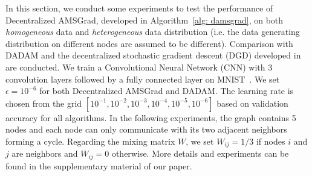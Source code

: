 \documentclass{article} %
\begin{document}
In this section, we conduct some experiments to test the performance of Decentralized AMSGrad, developed in Algorithm~\ref{alg: damsgrad}, on both \emph{homogeneous} data and \emph{heterogeneous} data distribution (i.e. the data generating distribution on different nodes are assumed to be different). 
Comparison with DADAM and the decentralized stochastic gradient descent (DGD) developed in \citet{lian2017can} are conducted. 
We train a Convolutional Neural Network (CNN) with 3 convolution layers followed by a fully connected layer on MNIST~\citep{lecun1998mnist}.
We set $\epsilon = 10^{-6}$ for both Decentralized AMSGrad and DADAM.
The learning rate is chosen from the grid $[10^{-1}, 10^{-2}, 10^{-3}, 10^{-4}, 10^{-5}, 10^{-6}]$ based on validation accuracy for all algorithms. 
In the following experiments, the graph contains 5 nodes and each node can only communicate with its two adjacent neighbors forming a cycle.
Regarding the mixing matrix $W$, we set $W_{ij} = 1/3$ if nodes $i$ and $j$ are neighbors and $W_{ij} = 0$ otherwise.
More details and experiments can be found in the supplementary material of our paper.\vspace{-0.05in}
\end{document}
